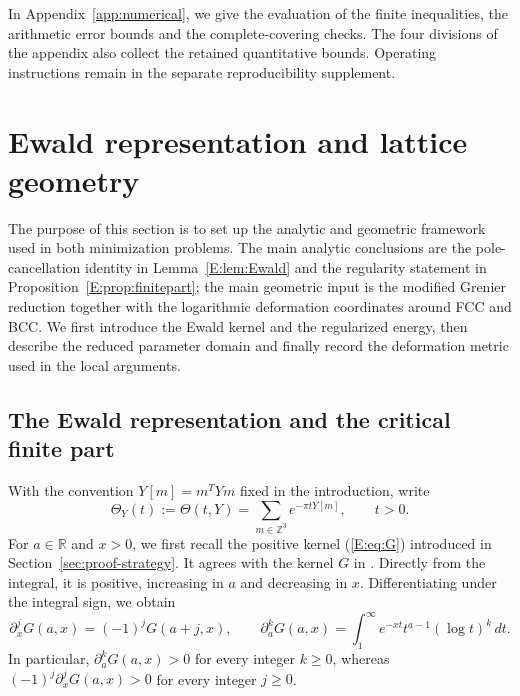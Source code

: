 \documentclass[reqno,english]{amsart}
\theoremstyle{definition}
\newtheorem{open problem}[theorem]{Open Problem}
\theoremstyle{remark}
\theoremstyle{plain}
\newcommand{\R}{{\mathbb R}}
\numberwithin{equation}{section}
\newcommand{\Z}{\mathbb Z}
\newcommand{\Th}{\Theta}
\begin{document}
In Appendix~\ref{app:numerical}, we give the evaluation of the finite
inequalities, the arithmetic error bounds and the complete-covering
checks. The four divisions of the appendix also collect the retained
quantitative bounds. Operating instructions remain in the separate
reproducibility supplement.


\section{Ewald representation and lattice geometry}\label{sec:analytic-geometry}\label{sec:common-geometry}\label{E:sec:reduction}

The purpose of this section is to set up the analytic and geometric framework used in both minimization problems. The main analytic conclusions are the pole-cancellation identity in Lemma~\ref{E:lem:Ewald} and the regularity statement in Proposition~\ref{E:prop:finitepart}; the main geometric input is the modified Grenier reduction together with the logarithmic deformation coordinates around FCC and BCC. We first introduce the Ewald kernel and the regularized energy, then describe the reduced parameter domain and finally record the deformation metric used in the local arguments.

\subsection{The Ewald representation and the critical finite part}\label{E:sec:ewald}
With the convention $Y[m]=m^TYm$ fixed in the introduction, write
\[
 \Theta_Y(t):=\Th(t,Y)=\sum_{m\in\Z^3}e^{-\pi tY[m]},\qquad t>0.
\]
For $a\in\R$ and $x>0$, we first recall the positive kernel (\ref{E:eq:G}) introduced in
Section~\ref{sec:proof-strategy}. It agrees with the kernel $G$ in \cite[(24)]{SS}. Directly from the
integral, it is positive, increasing in $a$ and decreasing in $x$.
Differentiating under the integral sign, we obtain
\begin{equation}
 \partial_x^jG(a,x)=(-1)^jG(a+j,x),\qquad
 \partial_a^kG(a,x)=\int_1^\infty e^{-xt}t^{a-1}(\log t)^k\,dt.
 \label{E:eq:G-derivatives}
\end{equation}
In particular, $\partial_a^kG(a,x)>0$ for every integer $k\ge0$,
whereas $(-1)^j\partial_x^jG(a,x)>0$ for every integer $j\ge0$.
\end{document}
